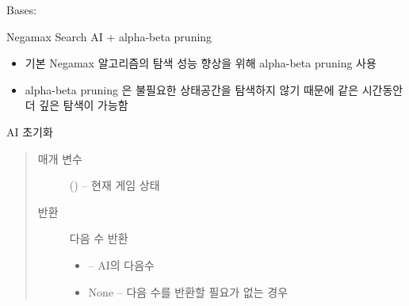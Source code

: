 \documentclass[letterpaper,10pt,english]{sphinxmanual}
\begin{document}
\begin{fulllineitems}
\label{\detokenize{agents.search:agents.search.abp_negamax_search_agent.ABPNegamaxSearchAgent}}
Bases: {\hyperref[\detokenize{agents:agents.BaseAgent}]{}}

Negamax Search AI + alpha-beta pruning
\begin{itemize}
\item {} 
기본 Negamax 알고리즘의 탐색 성능 향상을 위해 alpha-beta pruning 사용

\item {} 
alpha-beta pruning 은 불필요한 상태공간을 탐색하지 않기 때문에 같은 시간동안 더 깊은 탐색이 가능함

\end{itemize}

\begin{fulllineitems}
\label{\detokenize{agents.search:agents.search.abp_negamax_search_agent.ABPNegamaxSearchAgent.act}}
AI 초기화
\begin{quote}\begin{description}
\item[{매개 변수}] \leavevmode
{} ({\hyperref[\detokenize{scripts:scripts.run_game.State}]{}}) -- 현재 게임 상태

\item[{반환}] \leavevmode

다음 수 반환
\begin{itemize}
\item {} 
 -- AI의 다음수

\item {} 
None -- 다음 수를 반환할 필요가 없는 경우

\end{itemize}


\end{description}\end{quote}

\end{fulllineitems}


\end{fulllineitems}
\end{document}
